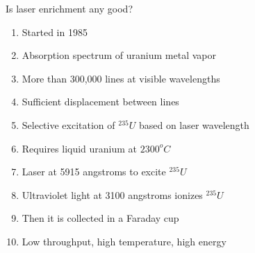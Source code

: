 \documentclass[aspectratio=1610,pdftex,dvipsnames,compress,xcolor={dvipsnames}]{beamer}
\begin{document}
\begin{frame}{Is laser enrichment any good?}
    \begin{enumerate}[topsep=0pt,itemsep=11pt,leftmargin=*,label=(\arabic*)]
        \item[]Started in 1985
        \item[]Absorption spectrum of uranium metal vapor
        \item[]More than 300,000 lines at visible wavelengths
        \item[]Sufficient displacement between lines
        \item[]Selective excitation of $^{235}U$ based on laser wavelength
        \item[]Requires liquid uranium at $2300^oC$
        \item[]Laser at 5915 angstroms to excite $^{235}U$
        \item[]Ultraviolet light at 3100 angstroms ionizes $^{235}U$
        \item[]Then it is collected in a Faraday cup
        \item[]Low throughput, high temperature, high energy
    \end{enumerate}
\end{frame}
\end{document}
